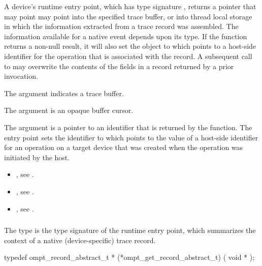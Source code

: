 \descr
A device's  runtime entry point, which has
type signature , returns a pointer that may 
point may point into the specified trace buffer, or into thread local 
storage in which the information extracted from a trace record was 
assembled. The information available for a native event depends upon 
its type. If the function returns a non-null result, it will also set the
object to which  points to a host-side identifier for the 
operation that is associated with the record. A subsequent call to 
 may overwrite the contents of the fields 
in a record returned by a prior invocation.

\argdesc
The  argument indicates a trace buffer.

The  argument is an opaque buffer cursor.

The  argument is a pointer to an identifier that is 
returned by the function. The entry point sets the identifier to which
 points to the value of a host-side identifier for an 
operation on a target device that was created when the operation was 
initiated by the host.

\crossreferences
\begin{itemize}
\item {}, see .

\item {}, see .

\item {}, see .
\end{itemize}



\subsubsection{}
\label{sec:ompt_get_record_abstract_t}

\summary
The  type is the type signature of the 
 runtime entry point, which summarizes the 
context of a native (device-specific) trace record.

\format
\begin{ccppspecific}
\begin{omptOther}
typedef ompt_record_abstract_t *
(*ompt_get_record_abstract_t) (
  void *
);
\end{omptOther}
\end{ccppspecific}

